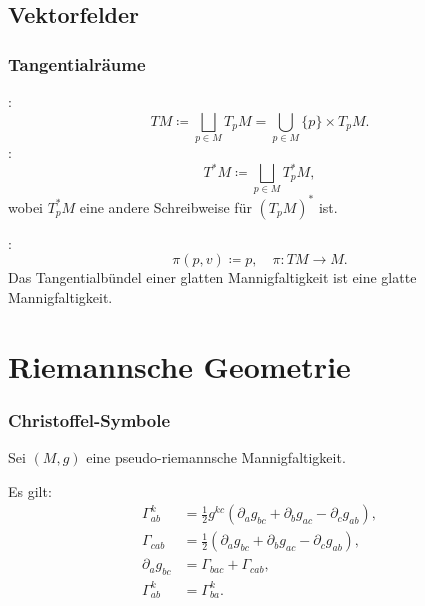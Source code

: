\subsection{Vektorfelder}
\subsubsection{Tangentialräume}

:
\begin{equation}
TM\coloneq \bigsqcup_{p\in M} T_p M = \bigcup_{p\in M} \{p\}\times T_p M.
\end{equation}
:
\begin{equation}
T^*M \coloneq \bigsqcup_{p\in M} T_p^* M,
\end{equation}
wobei $T_p^* M$ eine andere Schreibweise für
$(T_p M)^*$ ist.

:
\begin{equation}
\pi(p,v)\coloneq p,\quad\pi\colon TM\to M.
\end{equation}
Das Tangentialbündel einer glatten Mannigfaltigkeit ist eine
glatte Mannigfaltigkeit.

\section{Riemannsche Geometrie}
\subsubsection{Christoffel-Symbole}
Sei $(M,g)$ eine pseudo-riemannsche Mannigfaltigkeit.

Es gilt:
\begin{align}
\Gamma_{ab}^k &= \frac{1}{2} g^{kc}
(\partial_a g_{bc}+\partial_b g_{ac}-\partial_c g_{ab}),\\
\Gamma_{cab} &= \frac{1}{2}
(\partial_a g_{bc}+\partial_b g_{ac}-\partial_c g_{ab}),\\
\partial_a g_{bc} &= \Gamma_{bac}+\Gamma_{cab},\\
\Gamma_{ab}^k &= \Gamma_{ba}^k.
\end{align}


